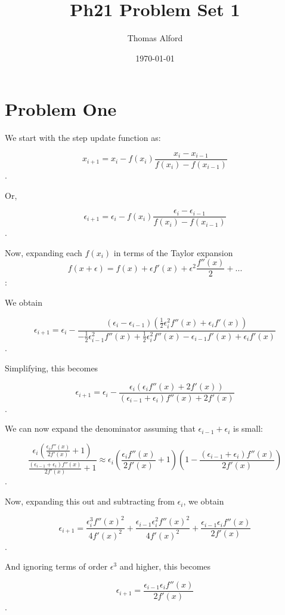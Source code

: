 \documentclass[11pt]{article}
\author{Thomas Alford}
\date{\today}
\title{Ph21 Problem Set 1}
\begin{document}
\maketitle

\section*{Problem One}
\label{sec-1}

We start with the step update function as: 

$$x_{i + 1} = x_{i} - f(x_i) \frac{x_i - x_{i - 1}}{f(x_i) - f(x_{i - 1})}$$.

Or, 

$${\epsilon}_{i + 1} = {\epsilon}_{i} - f(x_i) \frac{{\epsilon}_i -
{\epsilon}_{i - 1}}{f(x_i) - f(x_{i - 1})}$$.

Now, expanding each $f(x_i)$ in terms of the Taylor expansion $$f(x + \epsilon)
= f(x) + \epsilon f'(x) + {\epsilon}^2 \frac{f''(x)}{2} + ... $$:

We obtain

$$ \epsilon_{i + 1} = \epsilon_i - \frac{\left(\epsilon _i-\epsilon _{i-1}\right) \left(\frac{1}{2} \epsilon
   _i^2 f''(x)+\epsilon _i f'(x)\right)}{-\frac{1}{2} \epsilon _{i-1}^2
   f''(x)+\frac{1}{2} \epsilon _i^2 f''(x)-\epsilon _{i-1} f'(x)+\epsilon _i
   f'(x)}$$.

Simplifying, this becomes

$$  \epsilon_{i + 1} = \epsilon_i - \frac{\epsilon _i \left(\epsilon _i f''(x)+2 f'(x)\right)}{\left(\epsilon
_{i-1}+\epsilon _i\right) f''(x)+2 f'(x)}$$.

We can now expand the denominator assuming that ${\epsilon}_{i - 1} +
{\epsilon}_i$ is small:

$$ \frac{\epsilon _i \left(\frac{\epsilon _i f''(x)}{2
   f'(x)}+1\right)}{\frac{\left(\epsilon _{i-1}+\epsilon _i\right) f''(x)}{2
   f'(x)}+1} \approx \epsilon _i \left(\frac{\epsilon _i f''(x)}{2 f'(x)}+1\right)
   \left(1-\frac{\left(\epsilon _{i-1}+\epsilon _i\right) f''(x)}{2
   f'(x)}\right)$$.

Now, expanding this out and subtracting from $\epsilon_i$, we obtain 

$$ \epsilon_{i + 1} = \frac{\epsilon _i^3 f''(x)^2}{4 f'(x)^2}+\frac{\epsilon _{i-1} \epsilon _i^2
   f''(x)^2}{4 f'(x)^2}+\frac{\epsilon _{i-1} \epsilon _i f''(x)}{2 f'(x)}$$.

And ignoring terms of order $\epsilon^3$ and higher, this becomes

$$\epsilon _{i+1}=\frac{\epsilon _{i-1} \epsilon _i f''(x)}{2 f'(x)}$$.
\end{document}
